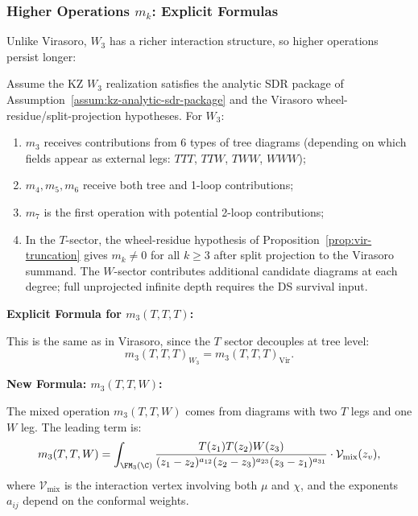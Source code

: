 \subsubsection{Higher Operations $m_k$: Explicit Formulas}

Unlike Virasoro, $W_3$ has a richer interaction structure, so higher operations persist longer:

\begin{proposition}
Assume the KZ $W_3$ realization satisfies the analytic SDR package of
Assumption~\textup{\ref{assum:kz-analytic-sdr-package}} and the
Virasoro wheel-residue/split-projection hypotheses.
For $W_3$:
\begin{enumerate}
\item $m_3$ receives contributions from 6 types of tree diagrams (depending on which fields appear as external legs: $TTT$, $TTW$, $TWW$, $WWW$);
\item $m_4, m_5, m_6$ receive both tree and 1-loop contributions;
\item $m_7$ is the first operation with potential 2-loop contributions;
\item In the $T$-sector, the wheel-residue hypothesis of
Proposition~\ref{prop:vir-truncation} gives
$m_k \neq 0$ for all $k \geq 3$ after split projection to the
Virasoro summand. The $W$-sector contributes additional candidate
diagrams at each degree; full unprojected infinite depth requires the
DS survival input.
\end{enumerate}
\end{proposition}

\textbf{Explicit Formula for $m_3(T,T,T)$:}

This is the same as in Virasoro, since the $T$ sector decouples at tree level:
\begin{equation}
m_3(T,T,T)_{W_3} = m_3(T,T,T)_{\text{Vir}}.
\end{equation}

\textbf{New Formula: $m_3(T,T,W)$:}

The mixed operation $m_3(T,T,W)$ comes from diagrams with two $T$ legs and one $W$ leg. The leading term is:
\begin{equation}
m_3(T,T,W) = \int_{\FM_3(\C)} \frac{T(z_1) T(z_2) W(z_3)}{(z_1-z_2)^{a_{12}} (z_2-z_3)^{a_{23}} (z_3-z_1)^{a_{31}}} \cdot \mathcal{V}_{\text{mix}}(z_v),
\end{equation}
where $\mathcal{V}_{\text{mix}}$ is the interaction vertex involving both $\mu$ and $\chi$, and the exponents $a_{ij}$ depend on the conformal weights.

